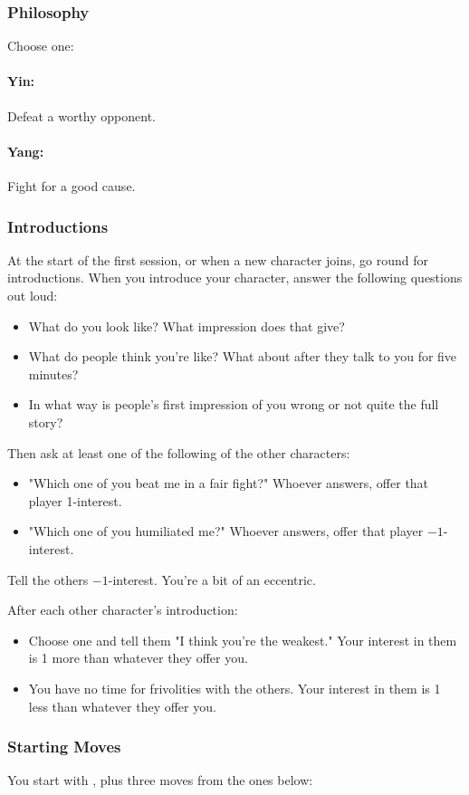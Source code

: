 \subsubsection{Philosophy}
Choose one:
\paragraph{Yin:} Defeat a worthy opponent.
\paragraph{Yang:} Fight for a good cause.

\subsubsection{Introductions}
At the start of the first session, or when a new character joins, go round for introductions.
When you introduce your character, answer the following questions out loud:
\begin{itemize}
\item What do you look like? What impression does that give?
\item What do people think you're like? What about after they talk to you for five minutes?
\item In what way is people's first impression of you wrong or not quite the full story?
\end{itemize}

Then ask at least one of the following of the other characters:
\begin{itemize}
\item "Which one of you beat me in a fair fight?" Whoever answers, offer that player 1-interest.
\item "Which one of you humiliated me?" Whoever answers, offer that player $-1$-interest.
\end{itemize}
Tell the others $-1$-interest. You're a bit of an eccentric.

After each other character's introduction:
\begin{itemize}
\item Choose one and tell them "I think you're the weakest." Your interest in them is 1 more than whatever they offer you.
\item You have no time for frivolities with the others. Your interest in them is 1 less than whatever they offer you.
\end{itemize}

\subsubsection{Starting Moves}
You start with , plus three moves from the ones below:

